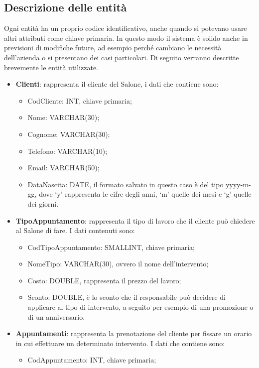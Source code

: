 {	\subsection{Descrizione delle entità}{
		Ogni entità ha un proprio codice identificativo, anche quando si potevano usare altri attributi come chiave primaria. In questo modo il sistema è solido anche in previsioni di modifiche future, ad esempio perché cambiano le necessità dell'azienda o si presentano dei casi particolari. Di seguito verranno descritte brevemente le entità utilizzate.
			\begin{itemize}\itemsep1pt
				\item \textbf{Clienti}: rappresenta il cliente del Salone, i dati che contiene sono:
					\begin{itemize}\itemsep1pt
						\item CodCliente: INT, chiave primaria;
						\item Nome: VARCHAR(30);
						\item Cognome: VARCHAR(30);
						\item Telefono: VARCHAR(10);
						\item Email: VARCHAR(50);
						\item DataNascita: DATE, il formato salvato in questo caso è del tipo yyyy-m-gg, dove `y' rappresenta le cifre degli anni, `m' quelle dei mesi e `g' quelle dei giorni.
					\end{itemize}
				\item \textbf{TipoAppuntamento}: rappresenta il tipo di lavoro che il cliente può chiedere al Salone di fare. I dati contenuti sono:
					\begin{itemize}\itemsep1pt
						\item CodTipoAppuntamento: SMALLINT, chiave primaria;
						\item NomeTipo: VARCHAR(30), ovvero il nome dell'intervento;
						\item Costo: DOUBLE, rappresenta il prezzo del lavoro;
						\item Sconto: DOUBLE, è lo sconto che il responsabile può decidere di applicare al tipo di intervento, a seguito per esempio di una promozione o di un anniversario. 
					\end{itemize}
				\item \textbf{Appuntamenti}: rappresenta la prenotazione del cliente per fissare un orario in cui effettuare un determinato intervento. I dati che contiene sono:
					\begin{itemize}\itemsep1pt
						\item CodAppuntamento: INT, chiave primaria;

\end{itemize}
\end{itemize}}}

